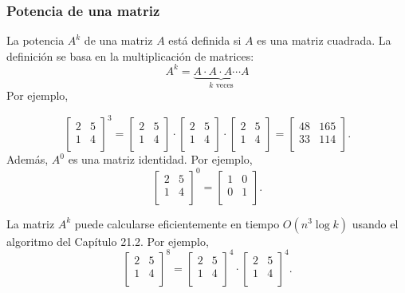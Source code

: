 \subsubsection{Potencia de una matriz}


La potencia $A^k$ de una matriz $A$ está definida
si $A$ es una matriz cuadrada.
La definición se basa en la multiplicación de matrices:
\[ A^k = \underbrace{A \cdot A \cdot A \cdots A}_{\textrm{$k$ veces}} \]
Por ejemplo,

\[
 \begin{bmatrix}
  2 & 5 \\
  1 & 4 \\
 \end{bmatrix}^3 =
 \begin{bmatrix}
  2 & 5 \\
  1 & 4 \\
 \end{bmatrix} \cdot
 \begin{bmatrix}
  2 & 5 \\
  1 & 4 \\
 \end{bmatrix} \cdot
 \begin{bmatrix}
  2 & 5 \\
  1 & 4 \\
 \end{bmatrix} =
 \begin{bmatrix}
  48 & 165 \\
  33 & 114 \\
 \end{bmatrix}.
\]
Además, $A^0$ es una matriz identidad. Por ejemplo,
\[
 \begin{bmatrix}
  2 & 5 \\
  1 & 4 \\
 \end{bmatrix}^0 =
 \begin{bmatrix}
  1 & 0 \\
  0 & 1 \\
 \end{bmatrix}.
\]

La matriz $A^k$ puede calcularse eficientemente
en tiempo $O(n^3 \log k)$ usando el
algoritmo del Capítulo 21.2. Por ejemplo,
\[
 \begin{bmatrix}
  2 & 5 \\
  1 & 4 \\
 \end{bmatrix}^8 =
 \begin{bmatrix}
  2 & 5 \\
  1 & 4 \\
 \end{bmatrix}^4 \cdot
 \begin{bmatrix}
  2 & 5 \\
  1 & 4 \\
 \end{bmatrix}^4.
\]

